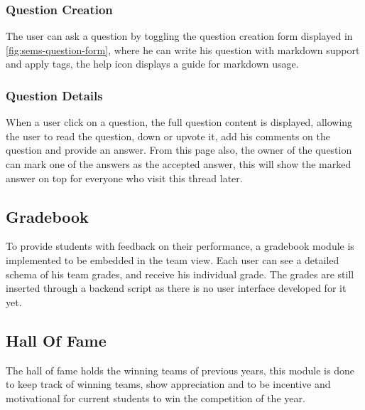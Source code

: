 \subsubsection{Question Creation}
\label{subs:question-creation}
The user can ask a question by toggling the question creation form displayed in \ref{fig:sems-question-form}, where he can
write his question with markdown support and apply tags, the help icon displays a guide for markdown usage.

\subsubsection{Question Details}
\label{subs:question-details}
When a user click on a question, the full question content is displayed, allowing the user to read the question, down or upvote it, add his comments
on the question and provide an answer. From this page also, the owner of the question can mark one of the answers as the accepted answer, this
will show the marked answer on top for everyone who visit this thread later.


\subsection{Gradebook}
\label{sub:gradebook}
To provide students with feedback on their performance, a gradebook module is implemented to be embedded in the team view. Each
user can see a detailed schema of his team grades, and receive his individual grade. The grades are still inserted through a backend
script as there is no user interface developed for it yet.

\subsection{Hall Of Fame}
\label{sub:hall-of-fame}
The hall of fame holds the winning teams of previous years, this module is done to keep track of winning teams, show appreciation and to
be incentive and motivational for current students to win the competition of the year.

